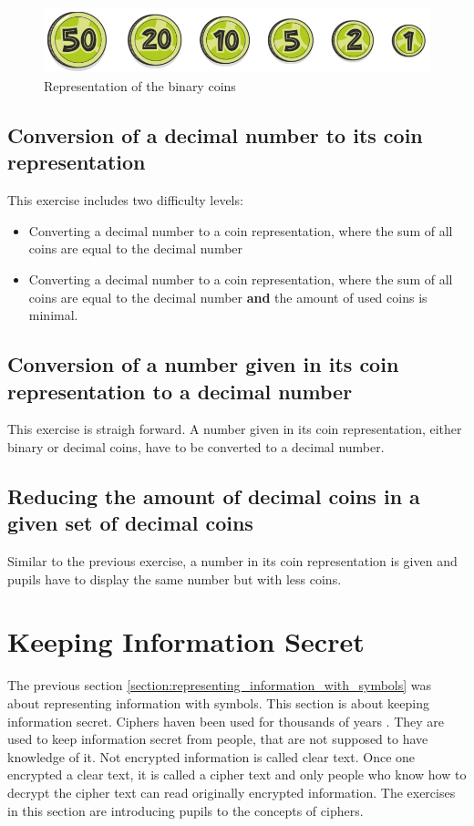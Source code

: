 \begin{figure} 
    \centering
    \includegraphics[width=0.5 \columnwidth]{figures/binary_coins.png}
    \caption{Representation of the binary coins} 
    \label{fig:binary_coins} 
\end{figure}

\subsection*{Conversion of a decimal number to its coin representation}

This exercise includes two difficulty levels:
\begin{itemize}
    \item Converting a decimal number to a coin representation, where the sum of all coins are equal to the decimal number
    \item Converting a decimal number to a coin representation, where the sum of all coins are equal to the decimal number \textbf{and} the amount of used coins is minimal.
\end{itemize}

\subsection*{Conversion of a number given in its coin representation to a decimal number}

This exercise is straigh forward. A number given in its coin representation, either binary or decimal coins, have to be converted to a decimal number. 

\subsection*{Reducing the amount of decimal coins in a given set of decimal coins}

Similar to the previous exercise, a number in its coin representation is given and pupils have to display the same number but with less coins.

\section{Keeping Information Secret}

The previous section \ref{section:representing_information_with_symbols} was about representing information with symbols. This section is about keeping information secret.
Ciphers haven been used for thousands of years \cite{HistoryOfCryptography}. They are used to keep information secret from people, that are not supposed to have knowledge of it. Not encrypted information is called clear text. Once one encrypted a clear text, it is called a cipher text and only people who know how to decrypt the cipher text can read originally encrypted information.
The exercises in this section are introducing pupils to the concepts of ciphers.

